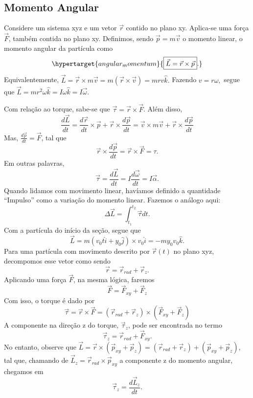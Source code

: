 \documentclass{article}
\begin{document}
\subsection{Momento Angular}
  Considere um sistema xyz e um vetor \(\vec{r}\) contido no plano xy. Aplica-se uma força \(\vec{F}\), também contida no plano xy. 
Definimos, sendo \(\vec{p} = m \vec{v}\) o momento linear, o momento angular da partícula como 
  \[
    \hypertarget{angular_momentum}{\boxed{\vec{L} = \vec{r}\times \vec{p}}.}
  \]
  Equivalentemente, \(\vec{L} = \vec{r}\times m \vec{v} = m(\vec{r}\times \vec{v}) = mrv\hat{k}.\) Fazendo
 \(v = r\omega,\) segue que \(\vec{L} = mr^{2}\omega \hat{k} = I\omega \hat{k} = I \vec{\omega }\). 

  Com relação ao torque, sabe-se que \(\vec{\tau} = \vec{r}\times \vec{F}\). Além disso, 
    \[
      \frac{d \vec{L}}{dt} = \frac{d \vec{r}}{dt}\times \vec{p} + \vec{r} \times \frac{d \vec{p}}{dt} = \vec{v}\times m \vec{v} + \vec{r}\times \frac{d \vec{p}}{dt}
    \]
  Mas, \(\frac{d \vec{p}}{dt} = \vec{F}\), tal que 
    \[
      \vec{r} \times \frac{d \vec{p}}{dt} = \vec{r}\times \vec{F} = \tau.
    \]
  Em outras palavras, 
    \[
      \vec{\tau } = \frac{d \vec{L}}{dt} = I \frac{d \vec{\omega }}{dt} = I \vec{\alpha }.
    \]
  Quando lidamos com movimento linear, havíamos definido a quantidade ``Impulso'' como a variação do momento linear. Fazemos o análogo aqui: 
    \[
      \Delta \vec{L} = \int_{t_{1}}^{t_{2}}\vec{\tau }dt.
    \]
  Com a partícula do início da seção, segue que 
    \[
      \vec{L} = m(v_{0}t\hat{i} + y_{0}\hat{j})\times v_{0}\hat{i} = -my_{0}v_{0}\hat{k}.
    \]
  Para uma partícula com movimento descrito por \(\vec{r}(t)\) no plano xyz, decompomos esse vetor como sendo 
    \[
      \vec{r} = \vec{r}_{rad} + \vec{r}_{z}.
    \]
  Aplicando uma força \(\vec{F}\), na mesma lógica, faremos 
    \[
      \vec{F} = \vec{F}_{xy} + \vec{F}_{z}
    \]
  Com isso, o torque é dado por 
  \[
    \vec{\tau } = \vec{r}\times \vec{F} = (\vec{r}_{rad} + \vec{r}_{z})\times(\vec{F}_{xy} + \vec{F}_{z})
  \]
  A componente na direção z do torque, \(\vec{\tau }_{z}\), pode ser encontrada no termo 
    \[
      \vec{\tau }_{z} = \vec{r}_{rad} + \vec{F}_{xy}.
    \]
  No entanto, observe que \(\vec{L} = \vec{r}\times (\vec{p}_{xy} + \vec{p}_{z}) = (\vec{r}_{rad} + \vec{r}_{z}) + (\vec{p}_{xy}+\vec{p}_{z})\), tal que,
chamando de \(\vec{L}_{z} = \vec{r}_{rad}\times \vec{p}_{xy}\) a componente z do momento angular, chegamos em 
  \[
    \vec{\tau }_{z} = \frac{d \vec{L}_{z}}{dt}.
  \]
\end{document}
